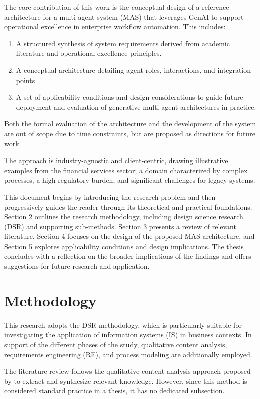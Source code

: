 The core contribution of this work is the conceptual design of a reference architecture for a multi-agent system (MAS) that leverages GenAI to support operational excellence in enterprise workflow automation. This includes:
\begin{enumerate}
    \item A structured synthesis of system requirements derived from academic literature and operational excellence principles.
    \item A conceptual architecture detailing agent roles, interactions, and integration points
    \item A set of applicability conditions and design considerations to guide future deployment and evaluation of generative multi-agent architectures in practice.
\end{enumerate}

Both the formal evaluation of the architecture and the development of the system are out of scope due to time constraints, but are proposed as directions for future work.


The approach is industry-agnostic and client-centric, drawing illustrative examples from the financial services sector; a domain characterized by complex processes, a high regulatory burden, and significant challenges for legacy systems.

This document begins by introducing the research problem and then progressively guides the reader through its theoretical and practical foundations. Section 2 outlines the research methodology, including design science research (DSR) and supporting sub-methods. Section 3 presents a review of relevant literature. Section 4 focuses on the design of the proposed MAS architecture, and Section 5 explores applicability conditions and design implications. The thesis concludes with a reflection on the broader implications of the findings and offers suggestions for future research and application.


\section{Methodology} \label{2methodology}
This research adopts the DSR methodology, which is particularly suitable for investigating the application of information systems (IS) in business contexts. In support of the different phases of the study, qualitative content analysis, requirements engineering (RE), and process modeling are additionally employed.

The literature review follows the qualitative content analysis approach proposed by \textcite{mayringQualitativeContentAnalysis2022} to extract and synthesize relevant knowledge. However, since this method is considered standard practice in a thesis, it has no dedicated subsection.

